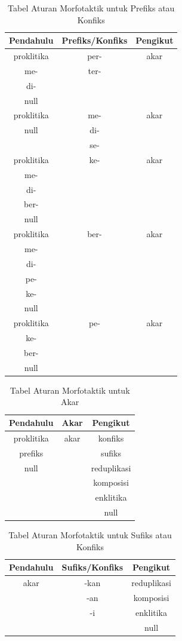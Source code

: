 \begin{table}[H]
\centering
\begin{tabular}{|c|c|c|}
\hline
\textbf{Pendahulu} & \textbf{Prefiks/Konfiks} & \textbf{Pengikut} \\
\hline
 proklitika&per-&akar\\
 me-&ter-& \\
 di-& & \\
 null& & \\
 \hline
 proklitika&me-&akar\\
 null&di-& \\
  &se-& \\
 \hline
 proklitika&ke-&akar\\
 me-& & \\
 di-& & \\
 ber-& & \\
 null& & \\
 \hline
 proklitika&ber-&akar\\
 me-& & \\
 di-& & \\
 pe-& & \\
 ke-& & \\
 null& & \\
 \hline
 proklitika&pe-&akar\\
 ke-& & \\
 ber-& & \\
 null& & \\
\hline
\end{tabular}
\caption{Tabel Aturan Morfotaktik untuk Prefiks atau Konfiks} 
\label{tabel-morfotaktik-prefiks}
\end{table}

\begin{table}[H]
\centering
\begin{tabular}{|c|c|c|}
\hline
\textbf{Pendahulu} & \textbf{Akar} & \textbf{Pengikut} \\
\hline
 proklitika&akar&konfiks\\
 prefiks& &sufiks\\
 null& &reduplikasi\\
 & &komposisi\\
 & &enklitika\\
 & &null\\
\hline
\end{tabular}
\caption{Tabel Aturan Morfotaktik untuk Akar} 
\label{tabel-morfotaktik-akar}
\end{table}

\begin{table}[H]
\centering
\begin{tabular}{|c|c|c|}
\hline
\textbf{Pendahulu} & \textbf{Sufiks/Konfiks} & \textbf{Pengikut} \\
\hline
 akar&-kan&reduplikasi\\
 &-an&komposisi\\
 &-i&enklitika\\
 & &null\\
\hline
\end{tabular}
\caption{Tabel Aturan Morfotaktik untuk Sufiks atau Konfiks} 
\label{tabel-morfotaktik-sufiks}
\end{table}


